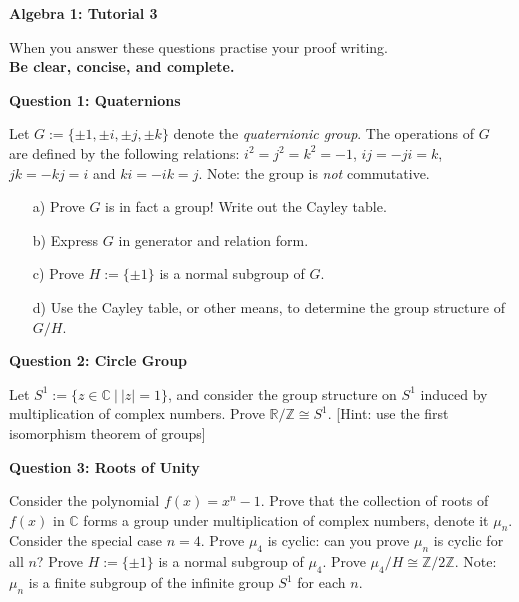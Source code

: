 \documentclass[11pt,twoside, a4paper]{report}
\theoremstyle{plain}
\theoremstyle{definition}
\begin{document}
\begin{center}
 \noindent\makebox[\linewidth]{\rule{14cm}{1.5pt}} 
{\bf Algebra 1: Tutorial 3 }
 \noindent\makebox[\linewidth]{\rule{14cm}{1.5pt}}  
 \noindent\makebox[\linewidth]{\rule{14cm}{3pt}}
\end{center}

\noindent When you answer these questions practise your proof writing.\\
  {\bf Be clear, concise, and complete.}
  
  
\begin{center}
{\bf Question 1: Quaternions}
\end{center}

Let $G:=\{\pm 1, \pm i, \pm j, \pm k\}$ denote the \emph{quaternionic group}. The operations of $G$ are defined by the following relations: $i^{2}=j^{2}=k^{2}=-1$, $ij=-ji=k$, $jk=-kj=i$ and $ki=-ik=j$. Note: the group is \emph{not} commutative. 
\begin{itemize}
\item[a)] Prove $G$ is in fact a group! Write out the Cayley table.
\item[b)] Express $G$ in generator and relation form. 
\item[c)] Prove $H:=\{\pm 1\}$ is a normal subgroup of $G$.
\item[d)] Use the Cayley table, or other means, to determine the group structure of $G/H$. 
\end{itemize} 


  
\begin{center}
{\bf Question 2: Circle Group}
\end{center}

Let $S^{1}:=\{z \in \mathbb{C} \ | \ |z|=1\}$, and consider the group structure on $S^{1}$ induced by multiplication of complex numbers. Prove $\mathbb{R}/\mathbb{Z} \cong S^{1}$. [Hint: use the first isomorphism theorem of groups]

  
\begin{center}
{\bf Question 3: Roots of Unity}
\end{center}

Consider the polynomial $f(x)=x^{n} - 1$. Prove that the collection of roots of $f(x)$ in $\mathbb{C}$ forms a group under multiplication of complex numbers, denote it $\mu_{n}$. Consider the special case $n=4$. Prove $\mu_{4}$ is cyclic: can you prove $\mu_{n}$ is cyclic for all $n$? Prove $H:=\{\pm 1\}$ is a normal subgroup of $\mu_{4}$. Prove $\mu_{4}/H\cong \mathbb{Z}/2\mathbb{Z}$. Note: $\mu_{n}$ is a finite subgroup of the infinite group $S^{1}$ for each $n$. 
\end{document}

